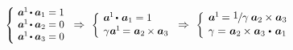 \begin{otherlanguage}{russian}
\nopagebreak\vspace{-0.1em}\begin{equation*}
\scalebox{0.9}[0.9]{$\left\{\hspace{-0.16em}\begin{array}{l}
\bm{a}^{\hspace{-0.1ex}1} \hspace{-0.2ex} \dotp \bm{a}_{1} = 1 \\
\bm{a}^{\hspace{-0.1ex}1} \hspace{-0.2ex} \dotp \bm{a}_{2} = 0 \\
\bm{a}^{\hspace{-0.1ex}1} \hspace{-0.2ex} \dotp \bm{a}_{3} = 0 \\[.05em]
\end{array}\right.$}
\Rightarrow\hspace{.33em}
%
\scalebox{0.92}[0.92]{$\left\{\hspace{-0.12em}\begin{array}{l}
\bm{a}^{\hspace{-0.1ex}1} \hspace{-0.2ex} \dotp \hspace{.2ex} \bm{a}_{1} = 1 \\[.1em]
\gamma \hspace{.1ex} \bm{a}^{\hspace{-0.1ex}1} \hspace{-0.2ex} = \hspace{.1ex} \bm{a}_2 \hspace{-0.1ex} \times \bm{a}_3 \\[.08em]
\end{array}\right.$}
\Rightarrow\hspace{.33em}
%
\scalebox{0.96}[0.96]{$\left\{\hspace{-0.11em}\begin{array}{l}
\bm{a}^{\hspace{-0.1ex}1} \hspace{-0.2ex} =
\displaystyle \nicefrac{\scalebox{0.95}{$1$}\hspace{.1ex}}{\scalebox{1.02}{$\gamma$}} \hspace{.5ex} \bm{a}_2 \hspace{-0.1ex} \times \bm{a}_3 \hspace{.1ex} \\[.08em]
\gamma = \hspace{.1ex} \bm{a}_2 \hspace{-0.1ex} \times \bm{a}_3 \hspace{.1ex} \dotp \hspace{.25ex} \bm{a}_{1} \\[.08em]
\end{array}\right.$}
\end{equation*}


\end{otherlanguage}
